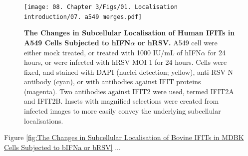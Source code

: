 \begin{figure}
    \centering
    \texttt{[image: 08. Chapter 3/Figs/01. Localisation introduction/07. a549 merges.pdf]}
    \caption[The Changes in Subcellular Localisation of Human IFITs in A549 Cells Subjected to hIFN\(\alpha\) or hRSV.]{\textbf{The Changes in Subcellular Localisation of Human IFITs in A549 Cells Subjected to hIFN\(\alpha\) or hRSV.} A549 cell were either mock treated, or treated with 1000 IU/mL of hIFN\(\alpha\) for 24 hours, or were infected with hRSV MOI 1 for 24 hours. Cells were fixed, and stained with DAPI (nuclei detection; yellow), anti-RSV N antibody (cyan), or with antibodies against IFIT proteins (magenta). Two antibodies against IFIT2 were used, termed IFIT2A and IFIT2B. Insets with magnified selections were created from infected images to more easily convey the underlying subcellular localisations.}
    \label{fig:The Changes in Subcellular Localisation of Human IFITs in A549 Cells Subjected to hIFNa or hRSV}
\end{figure}


Figure \ref{fig:The Changes in Subcellular Localisation of Bovine IFITs in MDBK Cells Subjected to bIFNa or bRSV} ...

